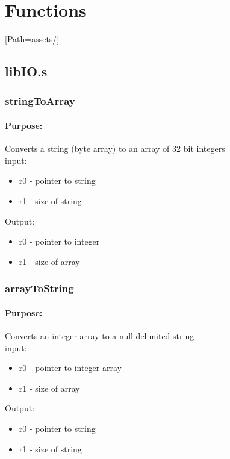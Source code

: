 \documentclass{article}
\begin{document}
\section{Functions}
\setmainfont{OpenSans-VariableFont_wdth,wght.ttf}[Path=assets/]
    \subsection{libIO.s}
        \subsubsection{stringToArray}
        \paragraph*{Purpose:}
            {Converts a string (byte array) to an array of 32 bit integers \\ }
            input:\begin{itemize}
                \item r0 - pointer to string
                \item r1 - size of string
            \end{itemize}
            Output:\begin{itemize}
                \item r0 - pointer to integer
                \item r1 - size of array
            \end{itemize}
            
        \subsubsection{arrayToString}
        \paragraph*{Purpose:}
            {Converts an integer array to a null delimited string \\ }
            input:\begin{itemize}
                \item r0 - pointer to integer array
                \item r1 - size of array
            \end{itemize}
            Output:\begin{itemize}
                \item r0 - pointer to string
                \item r1 - size of string
            \end{itemize}
\end{document}
